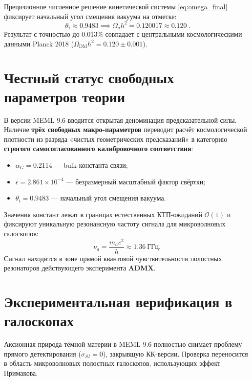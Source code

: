 \documentclass[12pt,a4paper]{article}
\begin{document}
Прецизионное численное решение кинетической системы \eqref{eq:omega_final} фиксирует начальный угол смещения вакуума на отметке:
\begin{equation}
\boxed{\; \theta_i \approx 0.9483 \implies \Omega_a h^2 = 0.120017 \approx 0.120 \;. }
\end{equation}
Результат с точностью до $0.013\%$ совпадает с центральными космологическими данными Planck 2018 ($\Omega_{\text{DM}} h^2 = 0.120 \pm 0.001$).

\section{Честный статус свободных параметров теории}
В версии MEML 9.6 вводится открытая деноминация предсказательной силы. Наличие \textbf{трёх свободных макро-параметров} переводит расчёт космологической плотности из разряда «чистых геометрических предсказаний» в категорию \textbf{строгого самосогласованного калибровочного соответствия}:
\begin{itemize}
\item $\alpha_G = 0.2114$ --- bulk-константа связи;
\item $\epsilon = 2.861 \times 10^{-4}$ --- безразмерный масштабный фактор свёртки;
\item $\theta_i = 0.9483$ --- начальный угол смещения вакуума.
\end{itemize}

Значения констант лежат в границах естественных КТП-ожиданий $\mathcal{O}(1)$ и фиксируют уникальную резонансную частоту сигнала для микроволновых галоскопов:
\begin{equation}
\nu_a = \frac{m_a c^2}{h} \approx 1.36 \ \text{ГГц}.
\end{equation}
Сигнал находится в зоне прямой квантовой чувствительности полостных резонаторов действующего эксперимента \textbf{ADMX}.

\section{Экспериментальная верификация в галоскопах}
Аксионная природа тёмной материи в MEML 9.6 полностью снимает проблему прямого детектирования ($\sigma_{SI} = 0$), закрывшую КК-версии. Проверка переносится в область микроволновых полостных галоскопов, использующих эффект Примакова.
\end{document}
